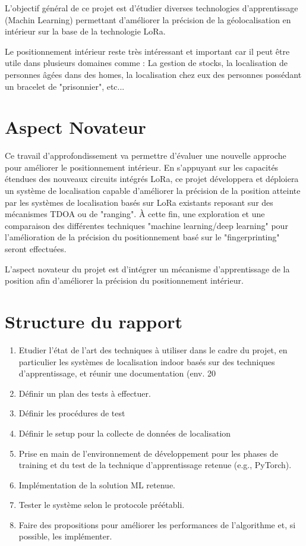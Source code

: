 L’objectif général de ce projet est d'étudier diverses technologies d'apprentissage (Machin Learning) permettant d'améliorer la précision de la géolocalisation en intérieur sur la base de la technologie LoRa. 

Le positionnement intérieur reste très intéressant et important car il peut être utile dans plusieurs domaines comme : La gestion de stocks, la localisation de personnes âgées dans des homes, la localisation chez eux des personnes possédant un bracelet de "prisonnier", etc...

\section{Aspect Novateur}
Ce travail d'approfondissement va permettre d'évaluer une nouvelle approche pour améliorer le positionnement intérieur. En s'appuyant sur les capacités étendues des nouveaux circuits intégrés LoRa, ce projet développera et déploiera un système de localisation capable d'améliorer la précision de la position atteinte par les systèmes de localisation basés sur LoRa existants reposant sur des mécanismes TDOA ou de "ranging". À cette fin, une exploration et une comparaison des différentes techniques "machine learning/deep learning" pour l'amélioration de la précision du positionnement basé sur le "fingerprinting" seront effectuées.

L'aspect novateur du projet est d'intégrer un mécanisme d'apprentissage de la position afin d'améliorer la précision du positionnement intérieur. 

\section{Structure du rapport}

\begin{enumerate}
	\item Etudier l’état de l’art des techniques à utiliser dans le cadre du projet, en particulier les systèmes de localisation indoor basés sur des techniques d’apprentissage, et réunir une documentation (env. 20%
	\item Définir un plan des tests à effectuer.
	\item Définir les procédures de test
	\item Définir le setup pour la collecte de données de localisation
	\item Prise en main de l’environnement de développement pour les phases de training et du test de la technique d’apprentissage retenue (e.g., PyTorch).
	\item Implémentation de la solution ML retenue.
	\item Tester le système selon le protocole préétabli.
	\item Faire des propositions pour améliorer les performances de l’algorithme et, si possible, les implémenter.
\end{enumerate}


